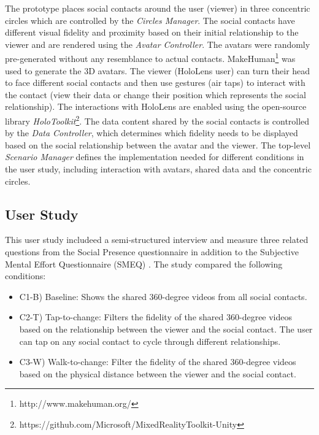 The prototype places social contacts around the user (viewer) in three concentric circles which are controlled by the \textit{Circles Manager}. The social contacts have different visual fidelity and proximity based on their initial relationship to the viewer and are rendered using the \textit{Avatar Controller}. The avatars were randomly pre-generated without any resemblance to actual contacts. MakeHuman\footnote{http://www.makehuman.org/} was used to generate the 3D avatars. The viewer (HoloLens user) can turn their head to face different social contacts and then use gestures (air taps) to interact with the contact (view their data or change their position which represents the social relationship). The interactions with HoloLens are enabled using the open-source library \textit{HoloToolkit}\footnote{https://github.com/Microsoft/MixedRealityToolkit-Unity}. The data content shared by the social contacts is controlled by the \textit{Data Controller}, which determines which fidelity needs to be displayed based on the social relationship between the avatar and the viewer. The top-level \textit{Scenario Manager} defines the implementation needed for different conditions in the user study, including interaction with avatars, shared data and the concentric circles. 

\subsection{User Study}
This user study includeed a semi-structured interview and measure three related questions from the Social Presence questionnaire in addition to the Subjective Mental Effort Questionnaire (SMEQ) \cite{Sauro2009}. The study compared the following conditions: 

\begin{itemize}
    \item C1-B) Baseline: Shows the shared 360-degree videos from all social contacts.
    \item C2-T) Tap-to-change: Filters the fidelity of the shared 360-degree videos based on the relationship between the viewer and the social contact. The user can tap on any social contact to cycle through different relationships.
    \item C3-W) Walk-to-change: Filter the fidelity of the shared 360-degree videos based on the physical distance between the viewer and the social contact.
\end{itemize}

